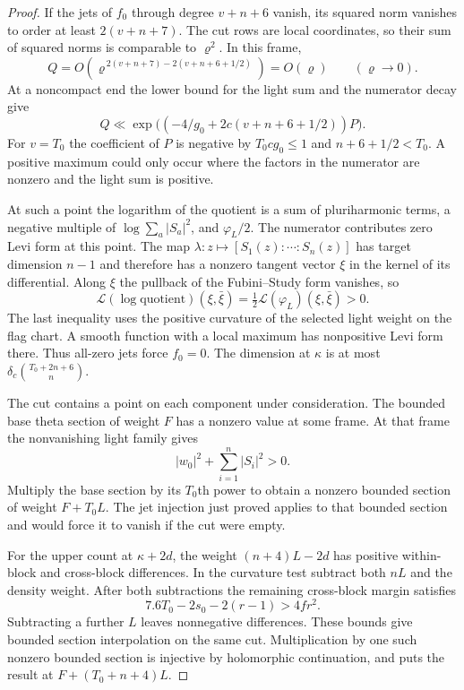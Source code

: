 \begin{proof}
If the jets of \(f_0\) through degree \(v+n+6\) vanish, its
squared norm vanishes to order at least \(2(v+n+7)\). The cut rows are
local coordinates, so their sum of squared norms is comparable to
\(\varrho^2\). In this frame,
\[
 Q=O\!\left(\varrho^{\,2(v+n+7)-2(v+n+6+1/2)}\right)
   =O(\varrho)\qquad(\varrho\to0).
\]
At a noncompact end the lower bound for the light sum and the
numerator decay give
\[
  Q\ll 
       \exp\bigl((-4/g_0+2c(v+n+6+1/2)) P\bigr).
\]
For \(v=T_0\) the coefficient of \(P\) is negative by
\(T_0cg_0\le1\) and \(n+6+1/2<T_0\). A positive maximum could only occur
where the factors in the numerator are nonzero and the light sum
is positive.

At such a point the logarithm of the quotient is a
sum of pluriharmonic terms, a negative multiple of
$\log\sum_a|S_a|^2$, and $\varphi_L/2$. The numerator contributes zero Levi form at this point.
The map \(\lambda:z\mapsto[S_1(z):\cdots:S_n(z)]\) has target
dimension \(n-1\) and therefore has a nonzero tangent vector
\(\xi\) in the kernel of its differential. Along \(\xi\) the
pullback of the Fubini--Study form vanishes, so
\[
   \mathcal L(\log\text{quotient})(\xi,\bar\xi)
        =\tfrac12\mathcal L(\varphi_L)(\xi,\bar\xi)>0 .
\]
The last inequality uses the positive curvature of the selected
light weight on the flag chart. A smooth function with a local
maximum has nonpositive Levi form there. Thus all-zero jets force
\(f_0=0\). The dimension at $\kappa$ is
at most $\delta_c\binom{T_0+2n+6}{n}$.

The cut contains a point on each component under consideration.
The bounded base theta section of weight $F$ has a nonzero value
at some frame. At that frame the nonvanishing light family gives
\[
  |w_0|^2+\sum_{i=1}^n|S_i|^2>0.
\]
 Multiply the base section by its
$T_0$th power to obtain a nonzero bounded section of weight
$F+T_0L$. The jet injection just proved applies to that bounded
section and would force it to vanish if the cut were empty.

For the upper count at $\kappa+2d$, the weight $(n+4)L-2d$
has positive within-block and cross-block differences. In the
curvature test subtract both $nL$ and the density weight. After both subtractions the remaining cross-block margin satisfies
\[
  7.6T_0-2s_0-2(r-1)>4fr^2.
\]
 Subtracting a further $L$
leaves nonnegative differences. These bounds give bounded
section interpolation on the same cut. Multiplication by one such nonzero
bounded section is injective by holomorphic continuation, and
puts the result at $F+(T_0+n+4)L$.


\end{proof}
